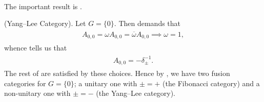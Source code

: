\noindent\\ The important result is \cite[Theorem 2]{EG17}.\newpage

\begin{example}\textup{(Yang--Lee Category).} Let $G = \{0\}$. Then \cite[Equation 4.7]{EG17} demands that
\begin{align*}
\begin{split}
A_{0,0} = \omega A_{0,0} = \overline{\omega}A_{0,0} \implies \omega = 1,
\end{split}
\end{align*}
whence \cite[Equation 4.8]{EG17} tells us that
\begin{align*}
\begin{split}
A_{0,0} = -\delta_\pm^{-1}.
\end{split}
\end{align*}
\noindent The rest of \cite[Equations 4.7--4.10]{EG17} are satisfied by these choices. Hence by \cite[Theorem 2]{EG17}, we have two fusion categories for $G = \{0\}$; a unitary one with $\pm = +$ (the Fibonacci category) and a non-unitary one with $\pm = -$ (the Yang--Lee category).
\end{example}

\newpage

\renewcommand\thesection{R}
\begingroup
\setlength{\emergencystretch}{.5em}
\printbibliography[heading=none]
\endgroup
\newpage

